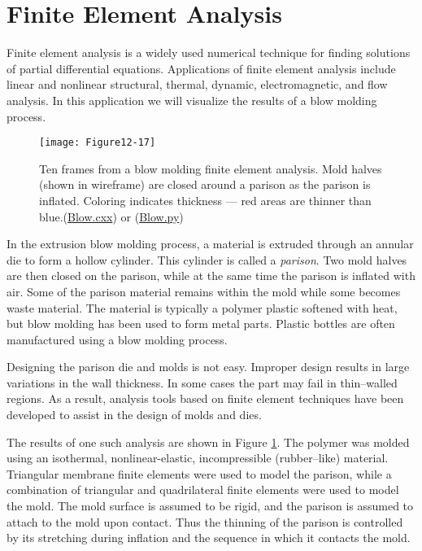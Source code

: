 \section{Finite Element Analysis}

Finite element analysis is a widely used numerical technique for finding solutions of partial differential equations. Applications of finite element analysis include linear and nonlinear structural, thermal, dynamic, electromagnetic, and flow analysis. In this application we will visualize the results of a blow molding process.

\begin{figure}[!htb]
	\centering
	\texttt{[image: Figure12-17]}
	\caption{Ten frames from a blow molding finite element analysis. Mold halves (shown in wireframe) are closed around a parison as the parison is inflated. Coloring indicates thickness --- red areas are thinner than blue.(\href{https://lorensen.github.io/VTKExamples/site/Cxx/Visualization/Blow/}{Blow.cxx}) or (\href{https://lorensen.github.io/VTKExamples/site/Python/Visualization/Blow/}{Blow.py})}
	\label{fig:Figure12-17}
\end{figure}

In the extrusion blow molding process, a material is extruded through an annular die to form a hollow cylinder. This cylinder is called a \emph{parison}. Two mold halves are then closed on the parison, while at the same time the parison is inflated with air. Some of the parison material remains within the mold while some becomes waste material. The material is typically a polymer plastic softened with heat, but blow molding has been used to form metal parts. Plastic bottles are often manufactured using a blow molding process.

Designing the parison die and molds is not easy. Improper design results in large variations in the wall thickness. In some cases the part may fail in thin--walled regions. As a result, analysis tools based on finite element techniques have been developed to assist in the design of molds and dies.

The results of one such analysis are shown in Figure \ref{fig:Figure12-17}. The polymer was molded using an isothermal, nonlinear-elastic, incompressible (rubber--like) material. Triangular membrane finite elements were used to model the parison, while a combination of triangular and quadrilateral finite elements were used to model the mold. The mold surface is assumed to be rigid, and the parison is assumed to attach to the mold upon contact. Thus the thinning of the parison is controlled by its stretching during inflation and the sequence in which it contacts the mold.


